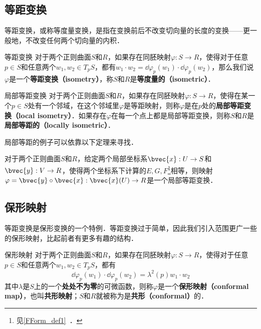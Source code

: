 
\subsection{等距变换}
等距变换，或称等度量变换，是指在变换前后不改变切向量的长度的变换——更一般地，不改变任何两个切向量的内积．

\begin{definition}{等距变换}
对于两个正则曲面$S$和$R$，如果存在同胚映射$\varphi:S\to R$，使得对于任意$p\in S$和任意两个$w_1, w_2\in T_pS$，都有$w_1\cdot w_2=\dd\varphi_p(w_1)\cdot\dd\varphi_p(w_2)$，那么我们说$\varphi$是一个\textbf{等距变换（isometry）}，称$S$和$R$是\textbf{等度量的（isometric）}．
\end{definition}

\begin{definition}{局部等距变换}
对于两个正则曲面$S$和$R$，如果存在同胚映射$\varphi:S\to R$，使得在某一个$p\in S$处有一个邻域，在这个邻域里$\varphi$是等距映射，则称$\varphi$是在$p$处的\textbf{局部等距变换（local isometry）}．如果存在$\varphi$在每一个点上都是局部等距变换，则称$S$和$R$是\textbf{局部等距的（locally isometric）}．
\end{definition}

局部等距的例子可以依靠以下定理来寻找．

\begin{theorem}{}
对于两个正则曲面$S$和$R$，给定两个局部坐标系$\bvec{x}:U\to S$和$\bvec{y}:V\to R$，使得两个坐标系下计算的$E, G, F$\footnote{见\autoref{FForm_def1}~．}相等，则映射$\varphi=\bvec{y}\circ\bvec{x}:\bvec{x}(U)\to R$是一个局部等距变换．
\end{theorem}

\subsection{保形映射}

等距变换是保形变换的一个特例．等距变换过于简单，因此我们引入范围更广一些的保形映射，比起前者有更多有趣的结构．

\begin{definition}{保形映射}
对于两个正则曲面$S$和$R$，如果存在同胚映射$\varphi:S\to R$，使得对于任意$p\in S$和任意两个$w_1, w_2\in T_pS$，都有\begin{equation}
\dd\varphi_p(w_1)\cdot\dd\varphi_p(w_2)=\lambda^2(p)w_1\cdot w_2
\end{equation}
其中$\lambda$是$S$上的一个\textbf{处处不为零}的可微函数，则称$\varphi$是一个\textbf{保形映射（conformal map）}，也叫\textbf{共形映射}；$S$和$R$就被称为是\textbf{共形（conformal）}的．
\end{definition}

